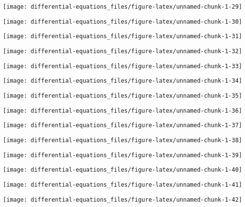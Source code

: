 \documentclass[]{tufte-handout}
\begin{document}
\begin{marginfigure}
\texttt{[image: differential-equations\_files/figure-latex/unnamed-chunk-1-29]} \end{marginfigure}
\begin{marginfigure}
\texttt{[image: differential-equations\_files/figure-latex/unnamed-chunk-1-30]} \end{marginfigure}
\begin{marginfigure}
\texttt{[image: differential-equations\_files/figure-latex/unnamed-chunk-1-31]} \end{marginfigure}
\begin{marginfigure}
\texttt{[image: differential-equations\_files/figure-latex/unnamed-chunk-1-32]} \end{marginfigure}
\begin{marginfigure}
\texttt{[image: differential-equations\_files/figure-latex/unnamed-chunk-1-33]} \end{marginfigure}
\begin{marginfigure}
\texttt{[image: differential-equations\_files/figure-latex/unnamed-chunk-1-34]} \end{marginfigure}
\begin{marginfigure}
\texttt{[image: differential-equations\_files/figure-latex/unnamed-chunk-1-35]} \end{marginfigure}
\begin{marginfigure}
\texttt{[image: differential-equations\_files/figure-latex/unnamed-chunk-1-36]} \end{marginfigure}
\begin{marginfigure}
\texttt{[image: differential-equations\_files/figure-latex/unnamed-chunk-1-37]} \end{marginfigure}
\begin{marginfigure}
\texttt{[image: differential-equations\_files/figure-latex/unnamed-chunk-1-38]} \end{marginfigure}
\begin{marginfigure}
\texttt{[image: differential-equations\_files/figure-latex/unnamed-chunk-1-39]} \end{marginfigure}
\begin{marginfigure}
\texttt{[image: differential-equations\_files/figure-latex/unnamed-chunk-1-40]} \end{marginfigure}
\begin{marginfigure}
\texttt{[image: differential-equations\_files/figure-latex/unnamed-chunk-1-41]} \end{marginfigure}
\begin{marginfigure}
\texttt{[image: differential-equations\_files/figure-latex/unnamed-chunk-1-42]} \end{marginfigure}
\end{document}
